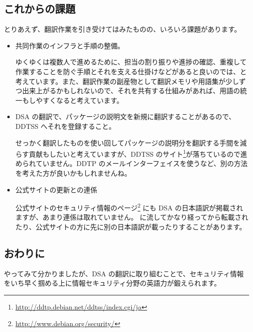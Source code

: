 \documentclass[mingoth,a4paper]{jsarticle}
\begin{document}
\subsection{これからの課題}

とりあえず、翻訳作業を引き受けてはみたものの、いろいろ課題があります。

\begin{itemize}


\item 共同作業のインフラと手順の整備。

ゆくゆくは複数人で進めるために、担当の割り振りや進捗の確認、重複して作業することを防ぐ手順とそれを支える仕掛けなどがあると良いのでは、と考えています。また、翻訳作業の副産物として翻訳メモリや用語集が少しずつ出来上がるかもしれないので、それを共有する仕組みがあれば、用語の統一もしやすくなると考えています。

\item DSA の翻訳で、パッケージの説明文を新規に翻訳することがあるので、DDTSS へそれを登録すること。

せっかく翻訳したものを使い回してパッケージの説明分を翻訳する手間を減らす貢献もしたいと考えていますが、DDTSS のサイト\footnote{\url{http://ddtp.debian.net/ddtss/index.cgi/ja}}が落ちているので進められていません。DDTP のメールインターフェイスを使うなど、別の方法を考えた方が良いかもしれませんね。

\item 公式サイトの更新との連係

公式サイトのセキュリティ情報のページ\footnote{\url{http://www.debian.org/security/}} にも DSA の日本語訳が掲載されますが、あまり連係は取れていません。 に流してかなり経ってから転載されたり、公式サイトの方に先に別の日本語訳が載ったりすることがあります。

\end{itemize}


\subsection{おわりに}

やってみて分かりましたが、DSA の翻訳に取り組むことで、セキュリティ情報をいち早く掴める上に情報セキュリティ分野の英語力が鍛えられます。
\end{document}
